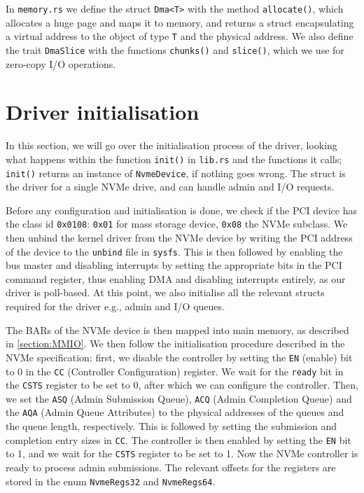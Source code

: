 In \texttt{memory.rs} we define the struct \texttt{Dma<T>} with the method \texttt{allocate()}, which allocates a huge page and maps it to memory, and returns a struct encapsulating a virtual address to the object of type \texttt{T} and the physical address. We also define the trait \texttt{DmaSlice} with the functions \texttt{chunks()} and \texttt{slice()}, which we use for zero-copy I/O operations.


\section{Driver initialisation}
In this section, we will go over the initialisation process of the driver, looking what happens within the function \texttt{init()} in \texttt{lib.rs} and the functions it calls; \texttt{init()} returns an instance of \texttt{NvmeDevice}, if nothing goes wrong. The struct is the driver for a single NVMe drive, and can handle admin and I/O requests.

Before any configuration and initialisation is done, we check if the PCI device has the class id \texttt{0x0108}: \texttt{0x01} for mass storage device, \texttt{0x08} the NVMe subclass.
We then unbind the kernel driver from the NVMe device by writing the PCI address of the device to the \texttt{unbind} file in \texttt{sysfs}. This is then followed by enabling the bus master and disabling interrupts by setting the appropriate bits in the PCI command register, thus enabling DMA and disabling interrupts entirely, as our driver is poll-based. At this point, we also initialise all the relevant structs required for the driver e.g., admin and I/O queues.

The BARs of the NVMe device is then mapped into main memory, as described in \autoref{section:MMIO}. We then follow the initialisation procedure described in the NVMe specification: first, we disable the controller by setting the \texttt{EN} (enable) bit to 0 in the \texttt{CC} (Controller Configuration) register. We wait for the \texttt{ready} bit in the \texttt{CSTS} register to be set to 0, after which we can configure the controller. Then, we set the \texttt{ASQ} (Admin Submission Queue), \texttt{ACQ} (Admin Completion Queue) and the \texttt{AQA} (Admin Queue Attributes) to the physical addresses of the queues and the queue length, respectively. This is followed by setting the submission and completion entry sizes in \texttt{CC}. The controller is then enabled by setting the \texttt{EN} bit to 1, and we wait for the \texttt{CSTS} register to be set to 1. Now the NVMe controller is ready to process admin submissions. The relevant offsets for the registers are stored in the enum \texttt{NvmeRegs32} and \texttt{NvmeRegs64}.

